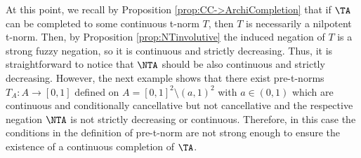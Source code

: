 At this point, we recall by Proposition \ref{prop:CC->ArchiCompletion} that if  $\TA$ can be completed to some continuous t-norm $T$, then $T$ is necessarily a nilpotent t-norm. Then, by Proposition \ref{prop:NTinvolutive} the induced negation of $T$ is a strong fuzzy negation, so it is continuous and strictly decreasing. Thus, it is straightforward to notice that $\NTA$ should be also continuous and strictly decreasing. However, the next example shows that there exist pre-t-norms $T_A:A \to [0,1]$ defined on $A=[0,1]^2 \setminus (a,1)^2$ with $a \in (0,1)$ which are continuous and conditionally cancellative but not cancellative and the respective negation $\NTA$ is not strictly decreasing or continuous. Therefore, in this case the conditions in the definition of pre-t-norm are not strong enough to ensure the existence of a continuous completion of $\TA$.

